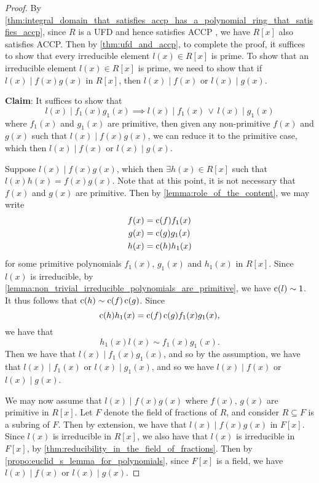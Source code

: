 \begin{proof}
  By \cref{thm:integral_domain_that_satisfies_accp_has_a_polynomial_ring_that_satisfies_accp}, since $R$ is a UFD and hence satisfies ACCP , we have $R[x]$ also satisfies ACCP. Then by \cref{thm:ufd_and_accp}, to complete the proof, it suffices to show that every irreducible element $l(x) \in R[x]$ is prime. To show that an irreducible element $l(x) \in R[x]$ is prime, we need to show that if $l(x) \mid f(x) g(x)$ in $R[x]$, then $l(x) \mid f(x)$ or $l(x) \mid g(x)$.

  \textbf{Claim}: It suffices to show that
  \begin{equation*}
    l(x) \mid f_1(x) g_1(x) \implies l(x) \mid f_1(x) \, \lor \, l(x) \mid g_1(x)
  \end{equation*}
  where $f_1(x)$ and $g_1(x)$ are primitive, then given any non-primitive $f(x)$ and $g(x)$ such that $l(x) \mid f(x) g(x)$, we can reduce it to the primitive case, which then $l(x) \mid f(x)$ or $l(x) \mid g(x)$.

  Suppose $l(x) \mid f(x) g(x)$, which then $\exists h(x) \in R[x]$ such that $l(x) h(x) = f(x) g(x)$. Note that at this point, it is not necessary that $f(x)$ and $g(x)$ are primitive. Then by \cref{lemma:role_of_the_content}, we may write
  \begin{align*}
    f(x) &= \operatorname{c}(f) f_1(x) \\
    g(x) &= \operatorname{c}(g) g_1(x) \\
    h(x) &= \operatorname{c}(h) h_1(x)
  \end{align*}
  for some primitive polynomials $f_1(x), \, g_1(x)$ and $h_1(x)$ in $R[x]$. Since $l(x)$ is irreducible, by \cref{lemma:non_trivial_irreducible_polynomials_are_primitive}, we have $\operatorname{c}(l) \sim 1$. It thus follows that $\operatorname{c}(h) \sim \operatorname{c}(f) \operatorname{c}(g)$. Since
  \begin{equation*}
    \operatorname{c}(h) h_1(x) = \operatorname{c}(f) \operatorname{c}(g) f_1(x) g_1(x),
  \end{equation*}
  we have that
  \begin{equation*}
    h_1(x) l(x) \sim f_1(x) g_1(x).
  \end{equation*}
  Then we have that $l(x) \mid f_1(x) g_1(x)$, and so by the assumption, we have that $l(x) \mid f_1(x)$ or $l(x) \mid g_1(x)$, and so we have $l(x) \mid f(x)$ or $l(x) \mid g(x)$.

  We may now assume that $l(x) \mid f(x) g(x)$ where $f(x), \, g(x)$ are primitive in $R[x]$. Let $F$ denote the field of fractions of $R$, and consider $R \subseteq F$ is a subring of $F$. Then by extension, we have that $l(x) \mid f(x) g(x)$ in $F[x]$. Since $l(x)$ is irreducible in $R[x]$, we also have that $l(x)$ is irreducible in $F[x]$, by \cref{thm:reducibility_in_the_field_of_fractions}. Then by \cref{propo:euclid_s_lemma_for_polynomials}, since $F[x]$ is a field, we have $l(x) \mid f(x)$ or $l(x) \mid g(x)$.


\end{proof}
